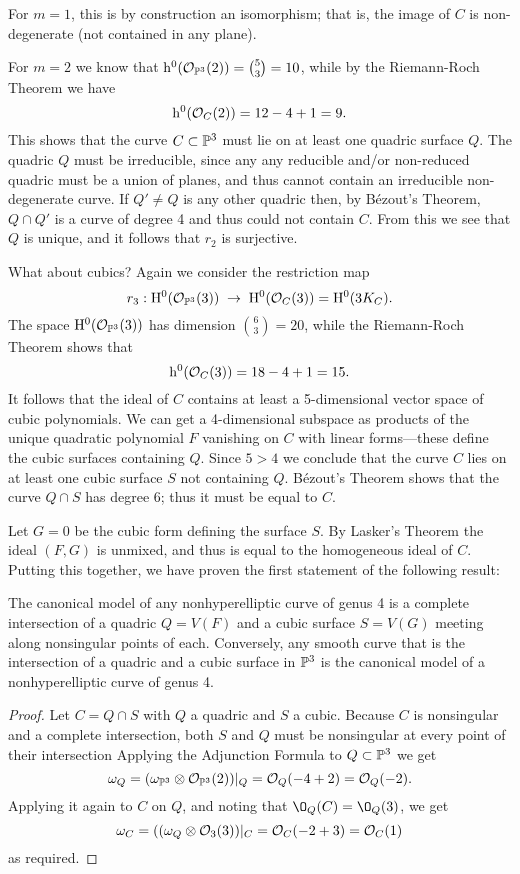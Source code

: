 For $m=1$, this is by construction an isomorphism; that is, the image of $C$ is non-degenerate (not contained in any plane).

For $m=2$ we know that $\h^0(\cO_{\PP^3}(2)) = \binom{5}{3} = 10$, while by the Riemann-Roch
Theorem we have
$$
\h^0(\cO_C(2)) = 12 - 4 + 1 = 9.
$$
This shows that the curve $C \subset \PP^3$ must lie on at least one quadric surface $Q$. The quadric $Q$ must be irreducible, since any any reducible and/or non-reduced quadric must be a union of planes, and thus cannot contain an irreducible non-degenerate curve.
If $Q'\neq Q$ is any other quadric then, by B\'ezout's Theorem, $Q\cap Q'$ is a curve of degree 4 and thus could not contain $C$. From this we see that $Q$ is unique, and it follows that $r_2$ is surjective.

What about cubics? Again we consider the restriction map
$$
r_3 : \HH^0(\cO_{\PP^3}(3)) \; \to \; \HH^0(\cO_{C}(3)) = \HH^0(3K_C).
$$
The space $\HH^0(\cO_{\PP^3}(3))$ has dimension $\binom{6}{3} = 20$, while  the Riemann-Roch Theorem shows that
$$
\h^0(\cO_C(3)) = 18 - 4 + 1 = 15.
$$
It follows that the ideal of $C$ contains at least a 5-dimensional vector space of cubic polynomials. We can get a 4-dimensional subspace as products of the unique quadratic polynomial $F$ vanishing on $C$ with linear forms---these define the cubic surfaces containing $Q$. Since $5 > 4$ we  conclude that the curve $C$ lies on at least one cubic surface $S$  not containing $Q$. 
B\'ezout's Theorem shows that the curve $Q \cap S$ has degree 6; thus it must be equal to $C$. 

Let $G=0$ be the cubic form defining the surface $S$. By Lasker's Theorem the ideal $(F,G)$ is unmixed, and thus is equal to the homogeneous ideal of $C$. Putting this together, we have proven the first statement of the following result:

\begin{theorem}
The canonical model of any nonhyperelliptic curve of genus 4 is a complete intersection of a quadric $Q = V(F)$ and a cubic surface $S = V(G)$ meeting along nonsingular points of each. Conversely, any smooth curve that is the intersection of a quadric and a cubic surface in $\PP^3$ is the canonical model of a nonhyperelliptic curve of genus 4.
\end{theorem}
 
\begin{proof}
Let $C = Q\cap S$ with $Q$ a quadric and $S$ a cubic. Because $C$ is nonsingular and a complete intersection, both $S$ and $Q$ must be nonsingular at every point of their intersection Applying the Adjunction Formula to $Q\subset \PP^3$ we get
$$
\omega_Q = (\omega_{\PP^3} \otimes \cO_{\PP^3}(2))|_Q = \cO_Q(-4+2) = \cO_Q(-2).
$$
Applying it again to $C$ on $Q$, and noting that $\O_Q(C) = \O_Q(3)$, we get
$$
\omega_C = ((\omega_{Q} \otimes \cO_{3}(3))|_C = \cO_C(-2+3) = \cO_C(1)
$$
as required. 
\end{proof}

